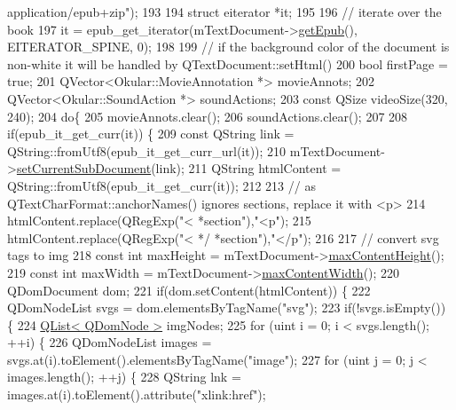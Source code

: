 \begin{DoxyCode}
{      application/epub+zip"});
193 
194   \textcolor{keyword}{struct }eiterator *it;
195 
196   \textcolor{comment}{// iterate over the book}
197   it = epub\_get\_iterator(mTextDocument->\hyperlink{classEpub_1_1EpubDocument_a37cb6d97564a7764b22e44523889267e}{getEpub}(), EITERATOR\_SPINE, 0);
198 
199   \textcolor{comment}{// if the background color of the document is non-white it will be handled by QTextDocument::setHtml()}
200   \textcolor{keywordtype}{bool} firstPage = \textcolor{keyword}{true};
201   QVector<Okular::MovieAnnotation *> movieAnnots;
202   QVector<Okular::SoundAction *> soundActions;
203   \textcolor{keyword}{const} QSize videoSize(320, 240);
204   \textcolor{keywordflow}{do}\{
205     movieAnnots.clear();
206     soundActions.clear();
207 
208     \textcolor{keywordflow}{if}(epub\_it\_get\_curr(it)) \{
209       \textcolor{keyword}{const} QString link = QString::fromUtf8(epub\_it\_get\_curr\_url(it));
210       mTextDocument->\hyperlink{classEpub_1_1EpubDocument_a6e36681fb7d345bf885150d884513fdf}{setCurrentSubDocument}(link);
211       QString htmlContent = QString::fromUtf8(epub\_it\_get\_curr(it));
212 
213       \textcolor{comment}{// as QTextCharFormat::anchorNames() ignores sections, replace it with <p>}
214       htmlContent.replace(QRegExp(\textcolor{stringliteral}{"< *section"}),\textcolor{stringliteral}{"<p"});
215       htmlContent.replace(QRegExp(\textcolor{stringliteral}{"< */ *section"}),\textcolor{stringliteral}{"</p"});
216 
217       \textcolor{comment}{// convert svg tags to img}
218       \textcolor{keyword}{const} \textcolor{keywordtype}{int} maxHeight = mTextDocument->\hyperlink{classEpub_1_1EpubDocument_ae8f068a3e013d7736293a195986d71cb}{maxContentHeight}();
219       \textcolor{keyword}{const} \textcolor{keywordtype}{int} maxWidth = mTextDocument->\hyperlink{classEpub_1_1EpubDocument_a214f084adb359a132c522ffec0d61aeb}{maxContentWidth}();
220       QDomDocument dom;
221       \textcolor{keywordflow}{if}(dom.setContent(htmlContent)) \{
222         QDomNodeList svgs = dom.elementsByTagName(\textcolor{stringliteral}{"svg"});
223         \textcolor{keywordflow}{if}(!svgs.isEmpty()) \{
224           \hyperlink{classQList}{QList< QDomNode >} imgNodes;
225           \textcolor{keywordflow}{for} (uint i = 0; i < svgs.length(); ++i) \{
226             QDomNodeList images = svgs.at(i).toElement().elementsByTagName(\textcolor{stringliteral}{"image"});
227             \textcolor{keywordflow}{for} (uint j = 0; j < images.length(); ++j) \{
228               QString lnk = images.at(i).toElement().attribute(\textcolor{stringliteral}{"xlink:href"});

\end{DoxyCode}
